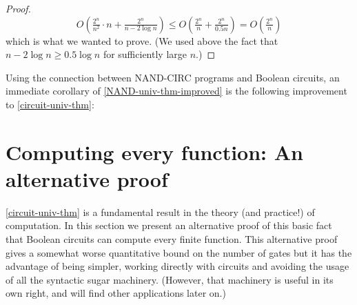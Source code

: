 \begin{proof}
\[
O\left(\tfrac{2^n}{n^2} \cdot n + \tfrac{2^n}{n-2\log n} \right)
\leq
O\left(\tfrac{2^n}{n}  + \tfrac{2^n}{0.5n} \right)  = O\left( \tfrac{2^n}{n} \right)
\] which is what we wanted to prove. (We used above the fact that
\(n - 2\log n \geq 0.5 \log n\) for sufficiently large \(n\).)

\end{proof}

Using the connection between NAND-CIRC programs and Boolean circuits, an
immediate corollary of \cref{NAND-univ-thm-improved} is the following
improvement to \cref{circuit-univ-thm}:

\hypertarget{circuit-univ-thm-improved}{}

\section{Computing every function: An alternative
proof}\label{seccomputalternative}

\cref{circuit-univ-thm} is a fundamental result in the theory (and
practice!) of computation. In this section we present an alternative
proof of this basic fact that Boolean circuits can compute every finite
function. This alternative proof gives a somewhat worse quantitative
bound on the number of gates but it has the advantage of being simpler,
working directly with circuits and avoiding the usage of all the
syntactic sugar machinery. (However, that machinery is useful in its own
right, and will find other applications later on.)

\hypertarget{circuit-univ-alt-thm}{}


